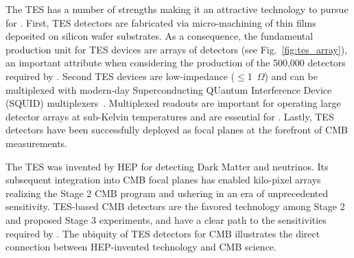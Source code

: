 The TES has a number of strengths making it an attractive technology to
pursue for \cmbexp. First, TES detectors are fabricated via
micro-machining of thin films deposited on silicon wafer
substrates. As a consequence, the fundamental production unit for TES
devices are arrays of detectors (see Fig.~\ref{fig:tes_array}), an
important attribute when considering the production of the 500,000
detectors required by \cmbexp.  Second TES devices are low-impedance
($\le$1~$\Omega$) and can be multiplexed with modern-day
Superconducting QUantum Interference Device (SQUID)
multiplexers~\cite{fmux,tmux,umux}. Multiplexed readouts are important
for operating large detector arrays at sub-Kelvin temperatures and are
essential for \cmbexp. Lastly, TES detectors have been successfully
deployed as focal planes at the forefront of CMB measurements.



The TES was invented by HEP for detecting Dark Matter and
neutrinos. Its subsequent integration into CMB focal planes has
enabled kilo-pixel arrays realizing the Stage 2 CMB program and
ushering in an era of unprecedented sensitivity. TES-based CMB
detectors are the favored technology among Stage 2 and proposed Stage
3 experiments, and have a clear path to the sensitivities required
by \cmbexp. The ubiquity of TES detectors for CMB illustrates the
direct connection between HEP-invented technology and CMB science.


